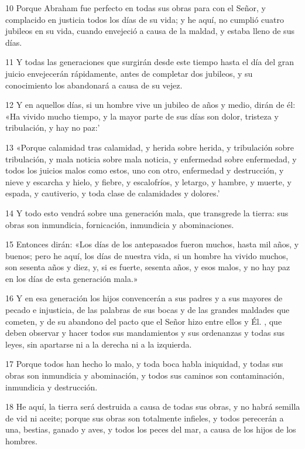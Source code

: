 \par 10 Porque Abraham fue perfecto en todas sus obras para con el Señor, y complacido en justicia todos los días de su vida; y he aquí, no cumplió cuatro jubileos en su vida, cuando envejeció a causa de la maldad, y estaba lleno de sus días.
\par 11 Y todas las generaciones que surgirán desde este tiempo hasta el día del gran juicio envejecerán rápidamente, antes de completar dos jubileos, y su conocimiento los abandonará a causa de su vejez.
\par 12 Y en aquellos días, si un hombre vive un jubileo de años y medio, dirán de él: «Ha vivido mucho tiempo, y la mayor parte de sus días son dolor, tristeza y tribulación, y hay no paz:'
\par 13 «Porque calamidad tras calamidad, y herida sobre herida, y tribulación sobre tribulación, y mala noticia sobre mala noticia, y enfermedad sobre enfermedad, y todos los juicios malos como estos, uno con otro, enfermedad y destrucción, y nieve y escarcha y hielo, y fiebre, y escalofríos, y letargo, y hambre, y muerte, y espada, y cautiverio, y toda clase de calamidades y dolores.'
\par 14 Y todo esto vendrá sobre una generación mala, que transgrede la tierra: sus obras son inmundicia, fornicación, inmundicia y abominaciones.
\par 15 Entonces dirán: «Los días de los antepasados ​​fueron muchos, hasta mil años, y buenos; pero he aquí, los días de nuestra vida, si un hombre ha vivido muchos, son sesenta años y diez, y, si es fuerte, sesenta años, y esos malos, y no hay paz en los días de esta generación mala.»
\par 16 Y en esa generación los hijos convencerán a sus padres y a sus mayores de pecado e injusticia, de las palabras de sus bocas y de las grandes maldades que cometen, y de su abandono del pacto que el Señor hizo entre ellos y Él. , que deben observar y hacer todos sus mandamientos y sus ordenanzas y todas sus leyes, sin apartarse ni a la derecha ni a la izquierda.
\par 17 Porque todos han hecho lo malo, y toda boca habla iniquidad, y todas sus obras son inmundicia y abominación, y todos sus caminos son contaminación, inmundicia y destrucción.
\par 18 He aquí, la tierra será destruida a causa de todas sus obras, y no habrá semilla de vid ni aceite; porque sus obras son totalmente infieles, y todos perecerán a una, bestias, ganado y aves, y todos los peces del mar, a causa de los hijos de los hombres.
